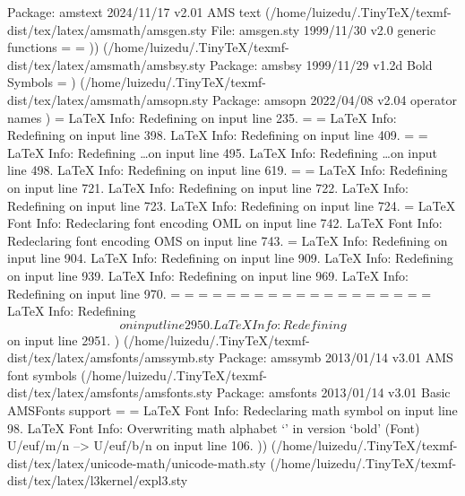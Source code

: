 Package: amstext 2024/11/17 v2.01 AMS text
(/home/luizedu/.TinyTeX/texmf-dist/tex/latex/amsmath/amsgen.sty
File: amsgen.sty 1999/11/30 v2.0 generic functions
\@emptytoks=
\ex@=
)) (/home/luizedu/.TinyTeX/texmf-dist/tex/latex/amsmath/amsbsy.sty
Package: amsbsy 1999/11/29 v1.2d Bold Symbols
\pmbraise@=
) (/home/luizedu/.TinyTeX/texmf-dist/tex/latex/amsmath/amsopn.sty
Package: amsopn 2022/04/08 v2.04 operator names
)
\inf@bad=
LaTeX Info: Redefining \frac on input line 235.
\uproot@=
\leftroot@=
LaTeX Info: Redefining \overline on input line 398.
LaTeX Info: Redefining \colon on input line 409.
\classnum@=
\DOTSCASE@=
LaTeX Info: Redefining \ldots on input line 495.
LaTeX Info: Redefining \dots on input line 498.
LaTeX Info: Redefining \cdots on input line 619.
\Mathstrutbox@=
\strutbox@=
LaTeX Info: Redefining \big on input line 721.
LaTeX Info: Redefining \Big on input line 722.
LaTeX Info: Redefining \bigg on input line 723.
LaTeX Info: Redefining \Bigg on input line 724.
\big@size=
LaTeX Font Info:    Redeclaring font encoding OML on input line 742.
LaTeX Font Info:    Redeclaring font encoding OMS on input line 743.
\macc@depth=
LaTeX Info: Redefining \bmod on input line 904.
LaTeX Info: Redefining \pmod on input line 909.
LaTeX Info: Redefining \smash on input line 939.
LaTeX Info: Redefining \relbar on input line 969.
LaTeX Info: Redefining \Relbar on input line 970.
\c@MaxMatrixCols=
\dotsspace@=
\c@parentequation=
\dspbrk@lvl=
\tag@help=
\row@=
\column@=
\maxfields@=
\andhelp@=
\eqnshift@=
\alignsep@=
\tagshift@=
\tagwidth@=
\totwidth@=
\lineht@=
\@envbody=
\multlinegap=
\multlinetaggap=
\mathdisplay@stack=
LaTeX Info: Redefining \[ on input line 2950.
LaTeX Info: Redefining \] on input line 2951.
) (/home/luizedu/.TinyTeX/texmf-dist/tex/latex/amsfonts/amssymb.sty
Package: amssymb 2013/01/14 v3.01 AMS font symbols
(/home/luizedu/.TinyTeX/texmf-dist/tex/latex/amsfonts/amsfonts.sty
Package: amsfonts 2013/01/14 v3.01 Basic AMSFonts support
\symAMSa=
\symAMSb=
LaTeX Font Info:    Redeclaring math symbol \hbar on input line 98.
LaTeX Font Info:    Overwriting math alphabet `\mathfrak' in version `bold'
(Font)                  U/euf/m/n --> U/euf/b/n on input line 106.
)) (/home/luizedu/.TinyTeX/texmf-dist/tex/latex/unicode-math/unicode-math.sty (/home/luizedu/.TinyTeX/texmf-dist/tex/latex/l3kernel/expl3.sty
